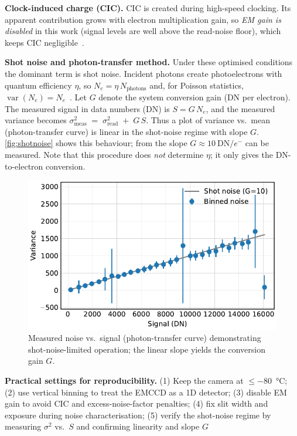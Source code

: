 \documentclass[
	parskip=half,
	a4paper,
]{scrarticle}
\begin{document}
\textbf{Clock-induced charge (CIC).}
CIC is created during high-speed clocking.
Its apparent contribution grows with electron multiplication gain, so \emph{EM gain is disabled} in this work (signal levels are well above the read-noise floor), which keeps CIC negligible~\cite{andorEstablishingSensitivityScientifica}.

\textbf{Shot noise and photon-transfer method.}
Under these optimised conditions the dominant term is shot noise.
Incident photons create photoelectrons with quantum efficiency \(\eta\), so \(N_e=\eta\,N_{\text{photons}}\) and, for Poisson statistics, \(\operatorname{var}(N_e)=N_e\)~\cite{europeanmachinevisionassociationStandardCharacterizationImage2010}.
Let \(G\) denote the system conversion gain (DN per electron). The measured signal in data numbers (DN) is \(S = G\,N_e\), and the measured variance becomes \(\sigma^2_{\text{meas}} \;=\; \sigma_{\text{read}}^2 \;+\; G\,S\).
Thus a plot of variance vs.\ mean (photon-transfer curve) is linear in the shot-noise regime with slope \(G\).
\autoref{fig:shotnoise} shows this behaviour; from the slope \(G \approx 10~\text{DN}/e^{-}\) can be measured.
Note that this procedure does \emph{not} determine \(\eta\); it only gives the DN-to-electron conversion.

\begin{figure}
    \centering
    \includegraphics{../analysis/figures/shot noise.pdf}
    \caption{Measured noise vs.\ signal (photon-transfer curve) demonstrating shot-noise-limited operation; the linear slope yields the conversion gain \(G\).}
    \label{fig:shotnoise}
\end{figure}

\textbf{Practical settings for reproducibility.}
(1) Keep the camera at \(\leq\)\SI{-80}{\degreeCelsius}; (2) use vertical binning to treat the EMCCD as a 1D detector; (3) disable EM gain to avoid CIC and excess-noise-factor penalties; (4) fix slit width and exposure during noise characterisation; (5) verify the shot-noise regime by measuring \(\sigma^2\) vs.\ \(S\) and confirming linearity and slope \(G\)
\end{document}

